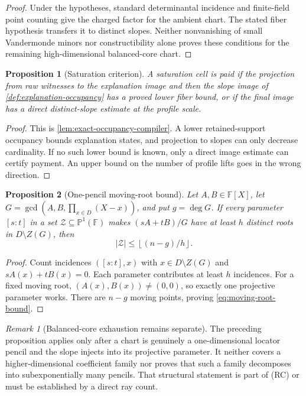 \documentclass[12pt,a4paper]{amsart}
\numberwithin{equation}{section}
\newtheorem{proposition}[proposition]{Proposition}
\theoremstyle{remark}
\newtheorem{remark}[remark]{Remark}
\newcommand{\F}{\mathbb F}
\newcommand{\abs}[1]{\lvert #1\rvert}
\newcommand{\floor}[1]{\left\lfloor #1\right\rfloor}
\begin{document}
\begin{proof}
Under the hypotheses, standard determinantal incidence and finite-field
point counting give the charged factor for the ambient chart.  The stated
fiber hypothesis transfers it to distinct slopes.  Neither nonvanishing of
small Vandermonde minors nor constructibility alone proves these conditions
for the remaining high-dimensional balanced-core chart.
\end{proof}

\begin{proposition}[Saturation criterion]\label{prop:saturation-payment}
A saturation cell is paid if the projection from raw witnesses to the
explanation image and then the slope image of
\cref{def:explanation-occupancy} has a proved lower fiber bound, or if the
final image has a direct distinct-slope estimate at the profile scale.
\end{proposition}

\begin{proof}
This is \cref{lem:exact-occupancy-compiler}.  A lower retained-support
occupancy bounds explanation states, and projection to slopes can only
decrease cardinality.  If no such lower bound is known, only a direct image
estimate can certify payment.  An upper bound on the number of profile lifts
goes in the wrong direction.
\end{proof}

\begin{proposition}[One-pencil moving-root bound]
\label{prop:split-pencil-payment}
Let \(A,B\in\F[X]\), let
\(G=\gcd(A,B,\prod_{x\in D}(X-x))\), and put \(g=\deg G\).  If every
parameter \([s:t]\) in a set \(\mathcal Z\subseteq\mathbb P^1(\F)\)
makes \((sA+tB)/G\) have at least \(h\) distinct roots in
\(D\setminus Z(G)\), then
\[
        \abs{\mathcal Z}\le\floor{(n-g)/h}.
        \tag{7.1}\label{eq:moving-root-bound}
\]
\end{proposition}

\begin{proof}
Count incidences \(([s:t],x)\) with \(x\in D\setminus Z(G)\) and
\(sA(x)+tB(x)=0\).  Each parameter contributes at least \(h\) incidences.
For a fixed moving root, \((A(x),B(x))\ne(0,0)\), so exactly one projective
parameter works.  There are \(n-g\) moving points, proving
\eqref{eq:moving-root-bound}.
\end{proof}

\begin{remark}[Balanced-core exhaustion remains separate]
\label{rem:balanced-core-exhaustion}
The preceding proposition applies only after a chart is genuinely a
one-dimensional locator pencil and the slope injects into its projective
parameter.  It neither covers a higher-dimensional coefficient family nor
proves that such a family decomposes into subexponentially many pencils.
That structural statement is part of \textup{(RC)} or must be established
by a direct ray count.
\end{remark}
\end{document}
